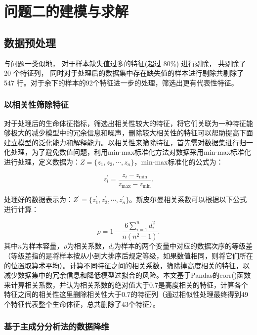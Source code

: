 \section{问题二的建模与求解}

\subsection{数据预处理}

与问题一类似地， 对于样本缺失值过多的特征(超过 80\%) 进行剔除， 共剔除了 20 个特征列， 同时对于处理后的数据集中存在缺失值的样本进行剔除共剔除了 547 行。对于余下的样本的92个特征进一步的处理，筛选出更有代表性特征。

\subsubsection{以相关性筛除特征}

对于处理后的生命体征指标，筛选出相关性较大的特征，将它们关联为一种特征能够极大的减少模型中的冗余信息和噪声，删除较大相关性的特征可以帮助提高下面建立模型的泛化能力和解释能力。以相关性来筛除特征，首先需对数据集进行归一化处理，为了避免数值问题，利用min-max标准化方法对数据采用min-max标准化进行处理，定义数据为：$Z=\{{{z}_{1}},{{z}_{2}},\cdots ,{{z}_{n}}\}$，min-max标准化的公式为：

\begin{equation}
    z_{i}^{'}=\frac{{{z}_{i}}-{{z}_{\min }}}{{{z}_{\max }}-{{z}_{\min }}}.
\end{equation}

处理好的数据表示为：${{Z}^{'}}=\{z_{1}^{'},z_{2}^{'},\cdots ,z_{n}^{'}\}$。斯皮尔曼相关系数可以根据以下公式进行计算：

\begin{equation}
    \rho =1-\frac{6\sum\limits_{i=1}^{n}{d_{i}^{2}}}{n({{n}^{2}}-1)}.
\end{equation}
其中$n$为样本容量，$\rho$为相关系数，${{d}_{i}}$为样本的两个变量中对应的数据次序的等级差（等级差指的是将样本按从小到大排序后规定等级，如果数值相同，则将它们所在的位置取算术平均）。计算不同特征之间的相关系数，筛除掉高度相关的特征，以减少数据集中的冗余信息和降低模型过拟合的风险。本文基于Pandas的corr()函数来计算相关系数，并认为相关系数的绝对值大于0.7是高度相关的特征，计算各个特征之间的相关性这里删除相关性大于0.7的特征列（通过相似性处理最终得到49个特征代表整个生命体征，总共删除了43个特征）。

\subsubsection{基于主成分分析法的数据降维}

